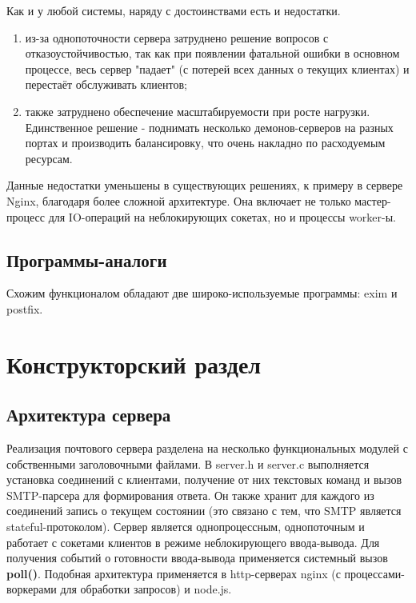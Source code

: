 \documentclass[a4paper,12pt]{report}
\begin{document}
Как и у любой системы, наряду с достоинствами есть и недостатки.
\begin{enumerate}
    \item из-за однопоточности сервера затруднено решение вопросов с отказоустойчивостью, так как при появлении фатальной ошибки в основном процессе, весь сервер "падает" (с потерей всех данных о текущих клиентах) и перестаёт обслуживать клиентов;
    \item также затруднено обеспечение масштабируемости при росте нагрузки. Единственное решение - поднимать несколько демонов-серверов на разных портах и производить балансировку, что очень накладно по расходуемым ресурсам.
\end{enumerate}

Данные недостатки уменьшены в существующих решениях, к примеру в сервере Nginx, благодаря более сложной архитектуре. Она включает не только мастер-процесс для IO-операций на неблокирующих сокетах, но и процессы worker-ы.


\section{Программы-аналоги}

Схожим функционалом обладают две широко-используемые программы: exim и postfix.


\chapter{Конструкторский раздел}

\section{Архитектура сервера}

Реализация почтового сервера разделена на несколько функциональных модулей с собственными заголовочными файлами. В server.h и server.c выполняется установка соединений с клиентами, получение от них текстовых команд и вызов SMTP-парсера для формирования ответа. Он также хранит для каждого из соединений запись о текущем состоянии (это связано с тем, что SMTP является stateful-протоколом). Сервер является однопроцессным, однопоточным и работает с сокетами клиентов в режиме неблокирующего ввода-вывода. Для получения событий о готовности ввода-вывода применяется системный вызов \textbf{poll()}. Подобная архитектура применяется в http-серверах nginx (с процессами-воркерами для обработки запросов) и node.js.
\end{document}
